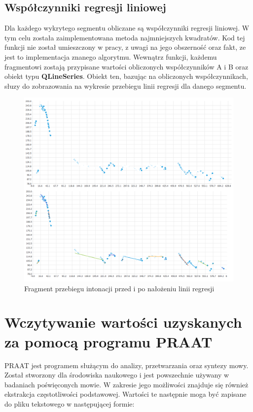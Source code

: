 \documentclass[a4paper,12 pt]{report}
\begin{document}
\subsection{Współczynniki regresji liniowej}
Dla każdego wykrytego segmentu obliczane są współczynniki regresji liniowej. W tym celu została zaimplementowana metoda najmniejszych kwadratów.
Kod tej funkcji nie został umieszczony w pracy, z uwagi na jego obszerność oraz fakt, ze jest to implementacja  znanego algorytmu. Wewnątrz funkcji, każdemu fragmentowi zostają przypisane wartości obliczonych współczynników A i B oraz obiekt typu \textbf{QLineSeries}. Obiekt ten, bazując na obliczonych współczynnikach, słuzy do zobrazowania na wykresie przebiegu linii regresji dla danego segmentu.
 \FloatBarrier
\begin{figure}[h]
\centering
\includegraphics[scale=0.6]{regresja.png}
\caption{Fragment przebiegu intonacji przed i po nałożeniu linii regresji}
\end{figure}
\FloatBarrier
\section{Wczytywanie wartości  uzyskanych za pomocą programu PRAAT}
PRAAT jest programem służącym do analizy, przetwarzania oraz syntezy mowy. Został stworzony dla środowiska naukowego i jest powszechnie używany w badaniach poświęconych mowie. W zakresie jego możliwości znajduje się również ekstrakcja częstotliwości podstawowej. Wartości te następnie moga być zapisane do pliku tekstowego w następującej formie:
\end{document}
